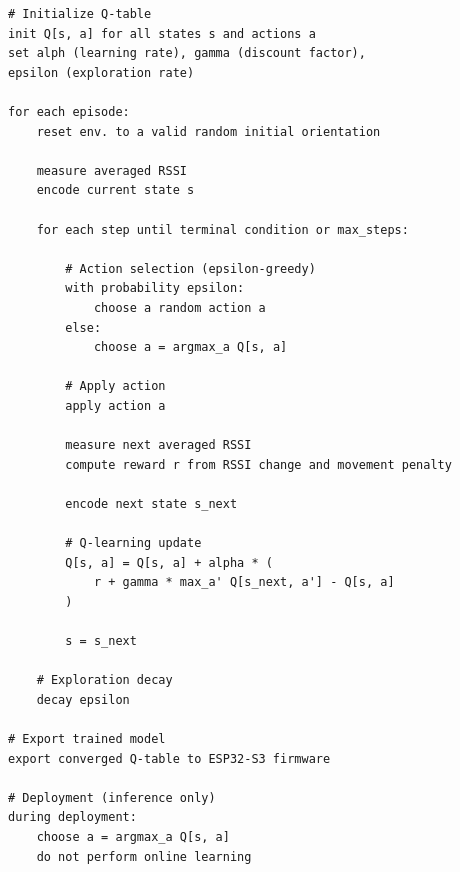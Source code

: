 \begin{verbatim}
# Initialize Q-table
init Q[s, a] for all states s and actions a
set alph (learning rate), gamma (discount factor), 
epsilon (exploration rate)

for each episode:
    reset env. to a valid random initial orientation
    
    measure averaged RSSI
    encode current state s

    for each step until terminal condition or max_steps:
        
        # Action selection (epsilon-greedy)
        with probability epsilon:
            choose a random action a
        else:
            choose a = argmax_a Q[s, a]

        # Apply action
        apply action a
        
        measure next averaged RSSI
        compute reward r from RSSI change and movement penalty
        
        encode next state s_next

        # Q-learning update
        Q[s, a] = Q[s, a] + alpha * (
            r + gamma * max_a' Q[s_next, a'] - Q[s, a]
        )

        s = s_next

    # Exploration decay
    decay epsilon

# Export trained model
export converged Q-table to ESP32-S3 firmware

# Deployment (inference only)
during deployment:
    choose a = argmax_a Q[s, a]
    do not perform online learning
\end{verbatim}


